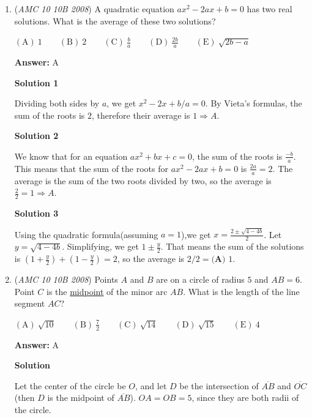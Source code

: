 \begin{enumerate}
 


	\item (\textit{AMC 10 10B 2008}) A quadratic equation $ax^2 - 2ax + b = 0$ has two real solutions. What is the average of these two solutions?


 $\mathrm{(A)}\ 1\qquad\mathrm{(B)}\ 2\qquad\mathrm{(C)}\ \frac ba\qquad\mathrm{(D)}\ \frac{2b}a\qquad\mathrm{(E)}\ \sqrt{2b-a}$

 \textbf{Answer: }A



\textbf{Solution 1}

Dividing both sides by $a$, we get $x^2 - 2x + b/a = 0$. By Vieta's formulas, the sum of the roots is $2$, therefore their average is $1\Rightarrow \boxed{A}$.

 



\textbf{Solution 2}

We know that for an equation $ax^2 + bx + c = 0$, the sum of the roots is $\frac{-b}{a}$. This means that the sum of the roots for $ax^2 - 2ax + b = 0$ is $\frac{2a}{a}=2$. The average is the sum of the two roots divided by two, so the average is $\frac22 = 1 \Rightarrow \boxed{A}$.

 



\textbf{Solution 3}

Using the quadratic formula(assuming $a=1$),we get $x = \frac{2 \pm \sqrt{4-4b}}{2}$. Let $y = \sqrt{4-4b}$. Simplifying, we get $1 \pm \frac{y}{2}$. That means the sum of the solutions is $(1+\frac{y}{2}) + (1-\frac{y}{2}) = 2$, so the average is $2/2 = \boxed{\textbf{(A) } 1}$.

 


	\item (\textit{AMC 10 10B 2008}) Points $A$ and $B$ are on a circle of radius $5$ and $AB=6$. Point $C$ is the \href{https://artofproblemsolving.com/wiki/index.php?title=Midpoint}{midpoint} of the minor arc $AB$. What is the length of the line segment $AC$?


 $\mathrm{(A)}\ \sqrt{10}\qquad\mathrm{(B)}\ \frac{7}{2}\qquad\mathrm{(C)}\ \sqrt{14}\qquad\mathrm{(D)}\ \sqrt{15}\qquad\mathrm{(E)}\ 4$

 \textbf{Answer: }A



\textbf{Solution}

Let the center of the circle be $O$, and let $D$ be the intersection of $\overline{AB}$ and $\overline{OC}$ (then $D$ is the midpoint of $\overline{AB}$). $OA=OB=5$, since they are both radii of the circle.


\end{enumerate}

